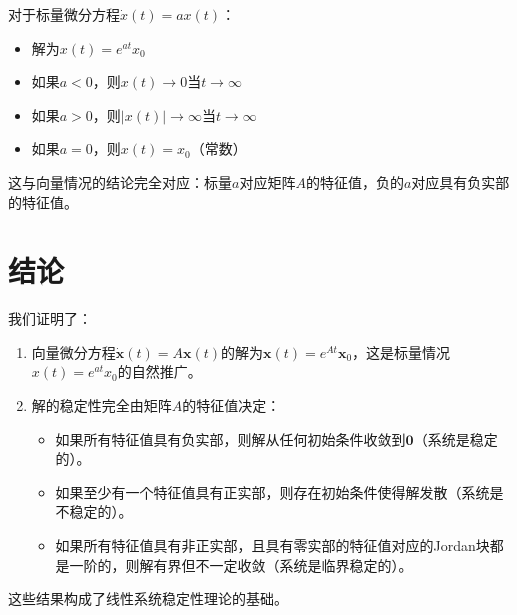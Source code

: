 \documentclass[12pt,a4paper]{article}
\begin{document}
对于标量微分方程$\dot{x}(t) = ax(t)$：
\begin{itemize}
\item 解为$x(t) = e^{at}x_0$
\item 如果$a < 0$，则$x(t) \to 0$当$t \to \infty$
\item 如果$a > 0$，则$|x(t)| \to \infty$当$t \to \infty$
\item 如果$a = 0$，则$x(t) = x_0$（常数）
\end{itemize}

这与向量情况的结论完全对应：标量$a$对应矩阵$A$的特征值，负的$a$对应具有负实部的特征值。

\section{结论}

我们证明了：
\begin{enumerate}
\item 向量微分方程$\dot{\mathbf{x}}(t) = A\mathbf{x}(t)$的解为$\mathbf{x}(t) = e^{At}\mathbf{x}_0$，这是标量情况$x(t) = e^{at}x_0$的自然推广。

\item 解的稳定性完全由矩阵$A$的特征值决定：
   \begin{itemize}
   \item 如果所有特征值具有负实部，则解从任何初始条件收敛到$\mathbf{0}$（系统是稳定的）。
   \item 如果至少有一个特征值具有正实部，则存在初始条件使得解发散（系统是不稳定的）。
   \item 如果所有特征值具有非正实部，且具有零实部的特征值对应的Jordan块都是一阶的，则解有界但不一定收敛（系统是临界稳定的）。
   \end{itemize}
\end{enumerate}

这些结果构成了线性系统稳定性理论的基础。
\end{document}
